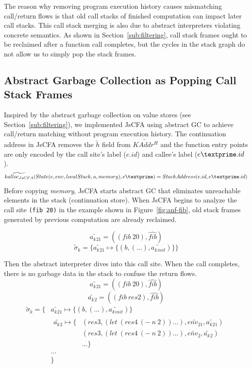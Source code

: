 \documentclass[12pt]{report}
\begin{document}
The reason why removing program execution history causes mismatching call/return flows is that old call stacks of finished computation can impact later call stacks. This call stack merging is also due to abstract interpreters violating concrete semantics. As shown in Section~\ref{sub:filtering}, call stack frames ought to be reclaimed after a function call completes, but the cycles in the stack graph do not allow us to simply pop the stack frames.

\subsection{Abstract Garbage Collection as Popping Call Stack Frames}
\label{subs:stack-gc}
Inspired by the abstract garbage collection on value stores (see Section~\ref{sub:filtering}), we implemented JsCFA using abstract GC to achieve call/return matching without program execution history. The continuation address in JsCFA removes the $\tilde{h}$ field from $\widetilde{KAddr^H}$ and the function entry points are only encoded by the call site's label ($e.id$) and callee's label ($e\textprime .id$).
\[
\widetilde{kalloc_{JsCFA}}(State(e, env, localStack, a, memory), e\textprime) = StackAddress(e.id, e\textprime .id)
\]
Before copying {\em memory}, JsCFA starts abstract GC that eliminates unreachable elements in the stack (continuation store).
When JsCFA begins to analyze the call site \verb|(fib 20)| in the example shown in Figure~\ref{fig:anf-fib}, old stack frames generated by previous computation are already reclaimed.

\[
\widetilde{a_k{}_{21}} = ((fib\ 20), \widehat{fib})
\]
\[
\tilde{\sigma}_k = \{\widetilde{a_k{}_{21}} \mapsto \{(b, (\dots), \widetilde{a_k{}_{init}}) \} \}
\]

Then the abstract interpreter dives into this call site. When the call completes, there is no garbage data in the stack to confuse the return flows.
\[
\widetilde{a_k{}_{21}} = ((fib\ 20), \widehat{fib})
\]
\[
\widetilde{a_k{}_{2}} = ((fib\ res2), \widehat{fib})
\]
\[
\begin{aligned}
\tilde{\sigma}_k = \{
                          {}& \widetilde{a_k{}_{21}} \mapsto \{(b, (\dots), \widetilde{a_k{}_{init}}) \} {}\\
                            &
                            \begin{aligned}
                              \widetilde{a_k{}_{2}} \mapsto
                              \{{}& (res3, (let\ (res4\ (-\ n\ 2)) \dots), \widetilde{env_{21}}, \widetilde{a_k{}_{21}}) {}\\
                              & (res3, (let\ (res4\ (-\ n\ 2)) \dots), \widetilde{env_2}, \widetilde{a_k{}_{2}}) {} \\
                              & \dots
                              \}
                            \end{aligned} {}\\
                            & \dots {}\\
                            & \}
\end{aligned}
\]
\end{document}
